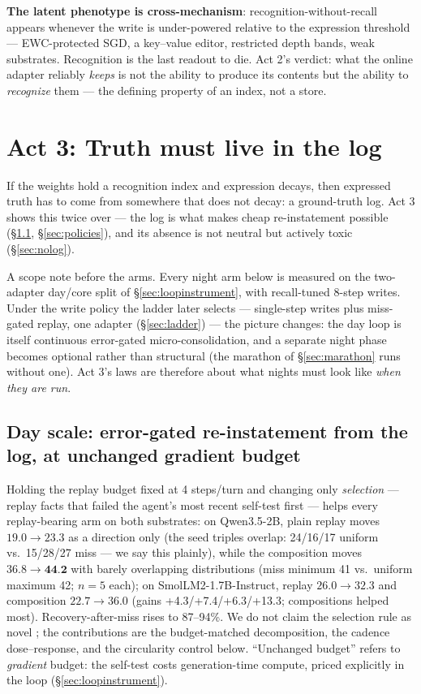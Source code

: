 \documentclass[11pt]{article}
\newcommand{\qwen}{Qwen3.5-2B}
\newcommand{\smol}{SmolLM2-1.7B-Instruct}
\begin{document}
\textbf{The latent phenotype is cross-mechanism}: recognition-without-recall appears whenever
the write is under-powered relative to the expression threshold --- EWC-protected SGD, a
key--value editor, restricted depth bands, weak substrates. Recognition is the last readout to
die. Act 2's verdict: what the online adapter reliably \emph{keeps} is not the ability to
produce its contents but the ability to \emph{recognize} them --- the defining property of an
index, not a store.

\section{Act 3: Truth must live in the log}\label{sec:act3}

If the weights hold a recognition index and expression decays, then expressed truth has to come
from somewhere that does not decay: a ground-truth log. Act 3 shows this twice over --- the log
is what makes cheap re-instatement possible (\S\ref{sec:act3day}, \S\ref{sec:policies}), and its
absence is not neutral but actively toxic (\S\ref{sec:nolog}).

A scope note before the arms. Every night arm below is measured on the two-adapter day/core
split of \S\ref{sec:loopinstrument}, with recall-tuned 8-step writes. Under the write policy the
ladder later selects --- single-step writes plus miss-gated replay, one adapter
(\S\ref{sec:ladder}) --- the picture changes: the day loop is itself continuous error-gated
micro-consolidation, and a separate night phase becomes optional rather than structural (the
marathon of \S\ref{sec:marathon} runs without one). Act 3's laws are therefore about what
nights must look like \emph{when they are run}.

\subsection{Day scale: error-gated re-instatement from the log, at unchanged gradient budget}
\label{sec:act3day}

Holding the replay budget fixed at 4 steps/turn and changing only \emph{selection} --- replay
facts that failed the agent's most recent self-test first --- helps every replay-bearing arm on
both substrates: on \qwen{}, plain replay moves $19.0\to23.3$ as a direction only (the seed
triples overlap: 24/16/17 uniform vs.\ 15/28/27 miss --- we say this plainly), while the
composition moves $36.8\to\textbf{44.2}$ with barely overlapping distributions (miss minimum 41
vs.\ uniform maximum 42; $n{=}5$ each); on \smol{}, replay $26.0\to32.3$ and composition
$22.7\to36.0$ (gains +4.3/+7.4/+6.3/+13.3; compositions helped most). Recovery-after-miss rises
to 87--94\%. We do not claim the selection rule as novel
\citep{aljundi2019mir,sure2025,mssr2026}; the contributions are the budget-matched
decomposition, the cadence dose--response, and the circularity control below. ``Unchanged
budget'' refers to \emph{gradient} budget: the self-test costs generation-time compute, priced
explicitly in the loop (\S\ref{sec:loopinstrument}).
\end{document}
